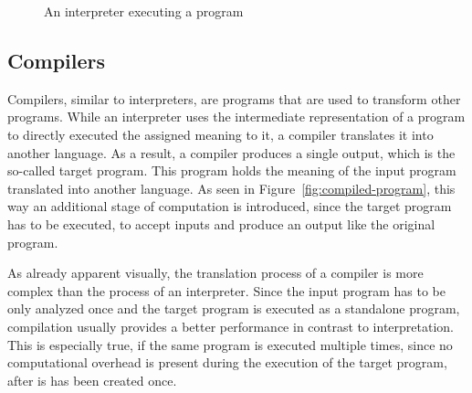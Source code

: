 \begin{figure}
  \centering
  \caption{An interpreter executing a program}\label{fig:interpreted-program}
\end{figure}


\subsection{Compilers}

Compilers, similar to interpreters, are programs that are used to transform other programs.
While an interpreter uses the intermediate representation of a program to directly executed the assigned meaning to it, a compiler translates it into another language.
As a result, a compiler produces a single output, which is the so-called target program.
This program holds the meaning of the input program translated into another language.
As seen in Figure~\ref{fig:compiled-program}, this way an additional stage of computation is introduced, since the target program has to be executed, to accept inputs and produce an output like the original program.

As already apparent visually, the translation process of a compiler is more complex than the process of an interpreter.
Since the input program has to be only analyzed once and the target program is executed as a standalone program, compilation usually provides a better performance in contrast to interpretation.
This is especially true, if the same program is executed multiple times, since no computational overhead is present during the execution of the target program, after is has been created once.

